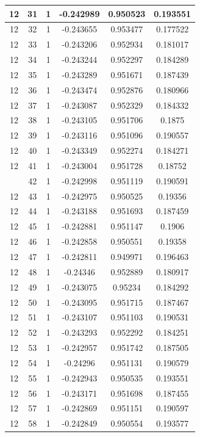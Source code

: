 \documentclass[12pt,a4paper]{article}
\numberwithin{equation}{section}
\numberwithin{figure}{section}
\numberwithin{table}{section}
\begin{document}
\begin{longtable}{|c|c|c|c|c|c|}
12 & 31 & 1 & -0.242989 & 0.950523 & 0.193551 \\ \hline
12 & 32 & 1 & -0.243655 & 0.953477 & 0.177522 \\ \hline
12 & 33 & 1 & -0.243206 & 0.952934 & 0.181017 \\ \hline
12 & 34 & 1 & -0.243244 & 0.952297 & 0.184289 \\ \hline
12 & 35 & 1 & -0.243289 & 0.951671 & 0.187439 \\ \hline
12 & 36 & 1 & -0.243474 & 0.952876 & 0.180966 \\ \hline
12 & 37 & 1 & -0.243087 & 0.952329 & 0.184332 \\ \hline
12 & 38 & 1 & -0.243105 & 0.951706 & 0.1875 \\ \hline
12 & 39 & 1 & -0.243116 & 0.951096 & 0.190557 \\ \hline
12 & 40 & 1 & -0.243349 & 0.952274 & 0.184271 \\ \hline
12 & 41 & 1 & -0.243004 & 0.951728 & 0.18752 \\ \hline
\pagebreak
12 & 42 & 1 & -0.242998 & 0.951119 & 0.190591 \\ \hline
12 & 43 & 1 & -0.242975 & 0.950525 & 0.19356 \\ \hline
12 & 44 & 1 & -0.243188 & 0.951693 & 0.187459 \\ \hline
12 & 45 & 1 & -0.242881 & 0.951147 & 0.1906 \\ \hline
12 & 46 & 1 & -0.242858 & 0.950551 & 0.19358 \\ \hline
12 & 47 & 1 & -0.242811 & 0.949971 & 0.196463 \\ \hline
12 & 48 & 1 & -0.24346 & 0.952889 & 0.180917 \\ \hline
12 & 49 & 1 & -0.243075 & 0.95234 & 0.184292 \\ \hline
12 & 50 & 1 & -0.243095 & 0.951715 & 0.187467 \\ \hline
12 & 51 & 1 & -0.243107 & 0.951103 & 0.190531 \\ \hline
12 & 52 & 1 & -0.243293 & 0.952292 & 0.184251 \\ \hline
12 & 53 & 1 & -0.242957 & 0.951742 & 0.187505 \\ \hline
12 & 54 & 1 & -0.24296 & 0.951131 & 0.190579 \\ \hline
12 & 55 & 1 & -0.242943 & 0.950535 & 0.193551 \\ \hline
12 & 56 & 1 & -0.243171 & 0.951698 & 0.187455 \\ \hline
12 & 57 & 1 & -0.242869 & 0.951151 & 0.190597 \\ \hline
12 & 58 & 1 & -0.242849 & 0.950554 & 0.193577 \\ \hline

\end{longtable}
\end{document}
